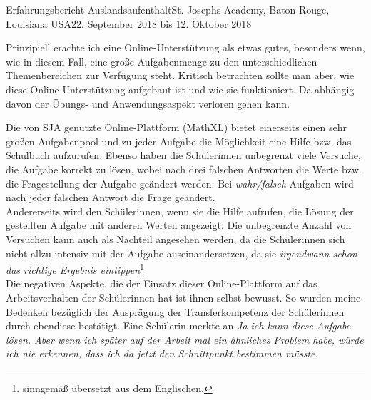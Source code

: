 \documentclass[oneside,openany,headings=optiontotoc,11pt,numbers=noenddot]{article}
\begin{document}
\begin{worksheet}{Erfahrungsbericht Auslandsaufenthalt}{St. Joseph\grq{}s Academy, Baton Rouge, Louisiana USA}{22. September 2018 bis 12. Oktober 2018}
		\begin{adjustwidth}{0.25cm}{}
			\small{Prinzipiell erachte ich eine Online-Unterstützung als etwas gutes, besonders wenn, wie in diesem Fall, eine große Aufgabenmenge zu den unterschiedlichen Themenbereichen zur Verfügung steht. Kritisch betrachten sollte man aber, wie diese Online-Unterstützung aufgebaut ist und wie sie funktioniert. Da abhängig davon der Übungs- und Anwendungsaspekt verloren gehen kann.}\normalsize\\
		\end{adjustwidth}
		\par\noindent
		Die von SJA genutzte Online-Plattform (MathXL) bietet einerseits einen sehr großen Aufgabenpool und zu jeder Aufgabe die Möglichkeit eine Hilfe bzw. das Schulbuch aufzurufen. Ebenso haben die Schülerinnen unbegrenzt viele Versuche, die Aufgabe korrekt zu lösen, wobei nach drei falschen Antworten die Werte bzw. die Fragestellung der Aufgabe geändert werden. Bei \textit{wahr/falsch}-Aufgaben wird nach jeder falschen Antwort die Frage geändert.\\
		Andererseits  wird den Schülerinnen, wenn sie die Hilfe aufrufen, die Lösung der gestellten Aufgabe mit anderen Werten angezeigt. Die unbegrenzte Anzahl von Versuchen kann auch als Nachteil angesehen werden, da die Schülerinnen sich nicht allzu intensiv mit der Aufgabe auseinandersetzen, da sie \glqq{}\textit{irgendwann schon das richtige Ergebnis eintippen}\grqq{}\footnote{\label{fn:trans}sinngemäß übersetzt aus dem Englischen.}\\
		Die negativen Aspekte, die der Einsatz dieser Online-Plattform auf das Arbeitsverhalten der Schülerinnen hat ist ihnen selbst bewusst. So wurden meine Bedenken bezüglich der Ausprägung der Transferkompetenz der Schülerinnen durch ebendiese bestätigt. Eine Schülerin merkte an \glqq{}\textit{Ja ich kann diese Aufgabe lösen. Aber wenn ich später auf der Arbeit mal ein ähnliches Problem habe, würde ich nie erkennen, dass ich da jetzt den Schnittpunkt bestimmen müsste.}\grqq{}

\end{worksheet}
\end{document}
